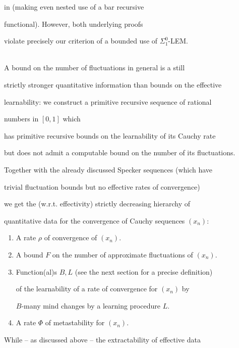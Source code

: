 \documentclass[1p]{elsarticle}
\theoremstyle{plain}
\theoremstyle{definition}
\theoremstyle{remark}
\theoremstyle{definition}
\begin{document}
in \cite{Kohlenbach(Baillon)} (making even nested use of a bar recursive 

functional). However, both underlying proofs 

violate precisely our criterion of a bounded use of $\Sigma^0_1$-LEM.  

\\[2mm]

A bound on the number of fluctuations in general is a still  

strictly stronger quantitative information than bounds on the effective 

learnability: we construct a primitive recursive sequence of rational 

numbers in $[0,1]$ which 

has primitive recursive bounds on the learnability of its Cauchy rate 

but does not admit a computable bound on the number of its fluctuations.

Together with the already discussed Specker sequences (which have 

trivial fluctuation bounds but no effective rates of convergence) 

we get the (w.r.t. effectivity) strictly decreasing hierarchy of 

quantitative data for the convergence of Cauchy sequences $(x_n)$:

\begin{enumerate}

\item 

A rate $\rho$ of convergence of $(x_n).$

\item 

A bound $F$ on the number of approximate fluctuations of $(x_n).$

\item 

Function(al)s $B,L$ (see the next section for a precise definition) 

of the learnability of a rate of convergence for $(x_n)$ by 

$B$-many mind changes by a learning procedure $L.$

\item 

A rate $\Phi$ of metastability for $(x_n).$

\end{enumerate}   

While -- as discussed above -- the extractability of effective data 
\end{document}
